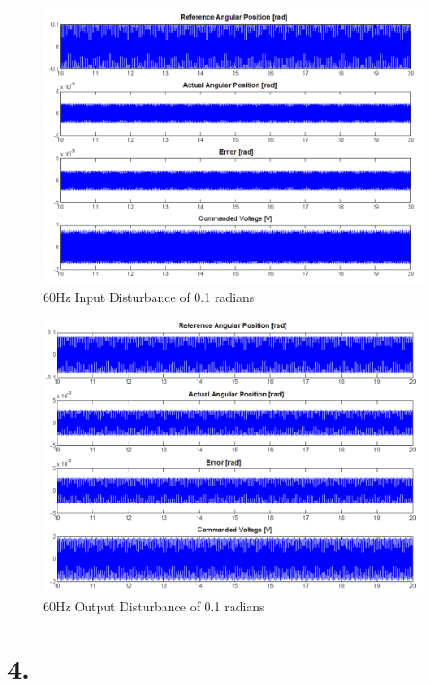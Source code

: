 \documentclass{article}
\theoremstyle{plain}
\theoremstyle{definition}
\theoremstyle{remark}
\begin{document}
\begin{figure}[htb]
\begin{center}
\includegraphics[width = 14 cm]{q3_20}
\caption{60Hz Input Disturbance of 0.1 radians}
\label{q3_18}
\end{center}
\end{figure}

\begin{figure}[htb]
\begin{center}
\includegraphics[width = 14 cm]{q3_21}
\caption{60Hz Output Disturbance of 0.1 radians}
\label{q3_21}
\end{center}
\end{figure}

\clearpage

\section*{4.}
\end{document}
